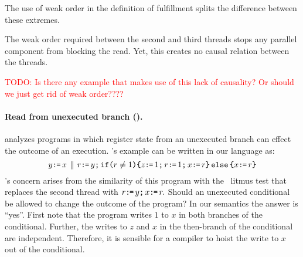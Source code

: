 The use of weak order in the definition of fulfillment splits the difference
between these extremes.
\begin{tikzdisplay}[node distance=1em]
\end{tikzdisplay}
The weak order required between the second and third threads stops any
parallel component from blocking the read.  Yet, this creates no causal
relation between the threads.

\textcolor{red}{TODO: Is there any example that makes use of this lack of
  causality?  Or should we just get rid of weak order????}


\paragraph{Read from unexecuted branch (\rfub).}
\begin{comment}
RFUB Example 1
Thread 1:	                        
r1 = x.load(memory_order_relaxed);
y.store(r1, memory_order_relaxed);	

Thread 2:
bool assigned_42(false);
r1 = y.load(memory_order_relaxed);
if (r1 != 42) {
    assigned_42 = true;
    r1 = 42;
}
x.store(r1, memory_order_relaxed);
assert_not(assigned_42);
\end{comment}

\citet{BoehmOOTA} analyzes programs in which register state from an
unexecuted branch can effect the outcome of an execution.  
\citeauthor{BoehmOOTA}'s  example can be written in our language as:
\begin{equation}
  \label{rfub}
  y\texttt{:}\mkern-1mu\texttt{=}\, x
  \,\mathbin{\|}\,
  r\texttt{:}\mkern-1mu\texttt{=}\, y\texttt{;}\,
  \texttt{if}\allowbreak\texttt{(}r \neq 1\texttt{)} \allowbreak\texttt{\{} z\texttt{:}\mkern-1mu\texttt{=}\, 1\texttt{;}\, r\texttt{:}\mkern-1mu\texttt{=}\, 1\texttt{;}\, x\texttt{:}\mkern-1mu\texttt{=}\, r \texttt{\}}\,\allowbreak\texttt{else}\allowbreak\,\texttt{\{} x\texttt{:}\mkern-1mu\texttt{=}\, r \texttt{\}}
\end{equation}
\citeauthor{BoehmOOTA}'s concern arises from the similarity of this program
with the \oota\ litmus test that replaces the second thread with
\begin{math}
  r\texttt{:}\mkern-1mu\texttt{=}\, y\texttt{;}\,
  x\texttt{:}\mkern-1mu\texttt{=}\, r.
\end{math}
Should an unexecuted conditional be allowed to change the outcome of the
program?  In our semantics the answer is ``yes''.  First note that the
program writes $1$ to $x$ in both branches of the conditional.  Further, the
writes to $z$ and $x$ in the then-branch of the conditional are independent.
Therefore, it is sensible for a compiler to hoist the write to $x$ out of the
conditional.

